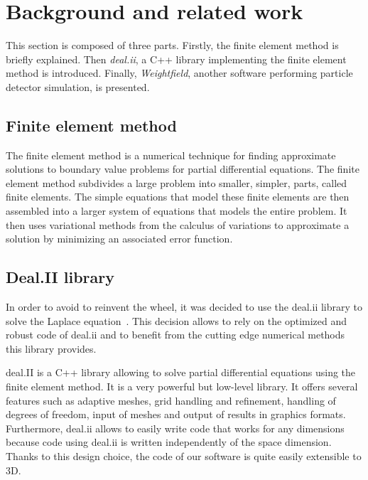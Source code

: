 \documentclass[11pt]{article}
\begin{document}
\section{Background and related work}

	This section is composed of three parts. Firstly,
	the finite element method is briefly explained. Then \textit{deal.ii},
	a C++ library implementing the finite element method is introduced. Finally,
	\textit{Weightfield}, another software performing particle detector simulation,
	is presented.

	\subsection{Finite element method}

		The finite element method is a numerical technique for
		finding approximate solutions to boundary value problems for partial
		differential equations. The finite element method subdivides a large
		problem into smaller, simpler, parts, called finite elements. The
		simple equations that model these finite elements are then assembled
		into a larger system of equations that models the entire problem. It
		then uses variational methods from the calculus of variations to
		approximate a solution by minimizing an associated error function.

	\subsection{Deal.II library}

		In order to avoid to reinvent the wheel, it was decided to use the deal.ii library
		to solve the Laplace equation~\cite{Bangerth:2007:DGO:1268776.1268779}. This decision allows to rely on the optimized
		and robust code of deal.ii and to benefit from the cutting edge numerical methods this library provides.

		deal.II is a C++ library allowing to solve partial differential equations
		using the finite element method. It is a very powerful but low-level library.
		It offers several features such as adaptive meshes, grid handling
		and refinement, handling of degrees of freedom, input of meshes and output of results in
		graphics formats. Furthermore, deal.ii allows to easily write code that works
		for any dimensions because code using deal.ii is written independently of the space
		dimension. Thanks to this design choice, the code of our software is quite easily
		extensible to 3D.
\end{document}
